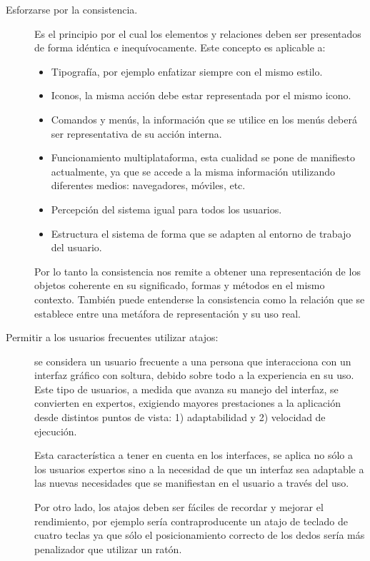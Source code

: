 \begin{description}
\item[Esforzarse por la consistencia.] Es el principio por el cual los
elementos y relaciones deben ser presentados de forma idéntica e inequívocamente. Este concepto es aplicable a:
\begin{itemize}
\item Tipografía, por ejemplo enfatizar siempre con el mismo estilo.
\item Iconos, la misma acción debe estar representada por el mismo icono.
\item Comandos y menús, la información que se utilice en los menús deberá ser representativa
de su acción interna.
\item Funcionamiento multiplataforma, esta cualidad se pone de manifiesto actualmente, ya que se accede a la misma información utilizando diferentes medios: navegadores, móviles, etc.
\item Percepción del sistema igual para todos los usuarios.
\item Estructura el sistema de forma que se adapten al entorno de trabajo del usuario.
\end{itemize}

Por lo tanto la consistencia nos remite a obtener una representación de los objetos 
coherente en su significado, formas y métodos en el mismo contexto. 
También puede entenderse la consistencia como la relación que se establece entre 
una metáfora de representación y su uso real.

\item[Permitir a los usuarios frecuentes utilizar atajos:] se considera un
usuario frecuente a una persona que interacciona con un interfaz gráfico con soltura, debido 
sobre todo a la experiencia en su uso. Este tipo de usuarios, a medida que avanza su 
manejo del interfaz, se convierten en expertos, exigiendo mayores prestaciones a la aplicación desde distintos puntos de vista: 
1) adaptabilidad y 2) velocidad de ejecución.

Esta característica a tener en cuenta en los interfaces, se aplica no sólo a los usuarios 
expertos sino a la necesidad de que un interfaz sea adaptable a las nuevas necesidades que se 
manifiestan en el usuario a través del uso.

Por otro lado, los atajos deben ser fáciles de recordar y mejorar el rendimiento, por ejemplo 
sería contraproducente un atajo de teclado de cuatro teclas ya que sólo el posicionamiento correcto 
de los dedos sería más penalizador que utilizar un ratón.


\end{description}
